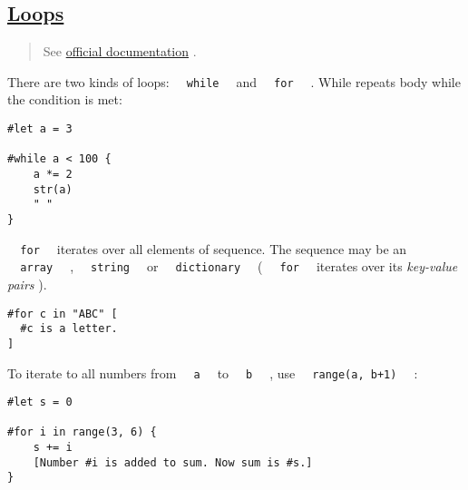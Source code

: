 \pandocbounded{}

\subsection{\texorpdfstring{\hyperref[loops]{Loops}}{Loops}}\label{loops}

\begin{quote}
See \href{https://typst.app/docs/reference/scripting/\#loops}{official
documentation} .
\end{quote}

There are two kinds of loops: \texttt{\ }{\texttt{\ while\ }}\texttt{\ }
and \texttt{\ }{\texttt{\ for\ }}\texttt{\ } . While repeats body while
the condition is met:

\begin{verbatim}
#let a = 3

#while a < 100 {
    a *= 2
    str(a)
    " "
}
\end{verbatim}

\pandocbounded{}

\texttt{\ }{\texttt{\ for\ }}\texttt{\ } iterates over all elements of
sequence. The sequence may be an
\texttt{\ }{\texttt{\ array\ }}\texttt{\ } ,
\texttt{\ }{\texttt{\ string\ }}\texttt{\ } or
\texttt{\ }{\texttt{\ dictionary\ }}\texttt{\ } (
\texttt{\ }{\texttt{\ for\ }}\texttt{\ } iterates over its
\emph{key-value pairs} ).

\begin{verbatim}
#for c in "ABC" [
  #c is a letter.
]
\end{verbatim}

\pandocbounded{}

To iterate to all numbers from \texttt{\ }{\texttt{\ a\ }}\texttt{\ } to
\texttt{\ }{\texttt{\ b\ }}\texttt{\ } , use
\texttt{\ }{\texttt{\ range(a,\ b+1)\ }}\texttt{\ } :

\begin{verbatim}
#let s = 0

#for i in range(3, 6) {
    s += i
    [Number #i is added to sum. Now sum is #s.]
}
\end{verbatim}

\pandocbounded{}

